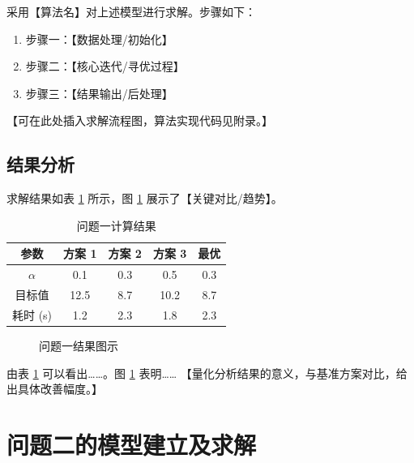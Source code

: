 \documentclass[withoutpreface,bwprint]{cumcmthesis}
\begin{document}
采用【算法名】对上述模型进行求解。步骤如下：

\begin{enumerate}
    \item 步骤一：【数据处理/初始化】
    \item 步骤二：【核心迭代/寻优过程】
    \item 步骤三：【结果输出/后处理】
\end{enumerate}

【可在此处插入求解流程图，算法实现代码见附录。】

\subsection{结果分析}

求解结果如表 \cref{tab:result1} 所示，图 \cref{fig:result1} 展示了【关键对比/趋势】。

{\renewcommand{\arraystretch}{1.38}
\setlength{\tabcolsep}{6pt}
\begin{longtable}{ccccc}
    \caption{问题一计算结果}\label{tab:result1}\\
    \toprule[1.5pt]
    参数       & 方案 1 & 方案 2 & 方案 3 & 最优  \\
    \midrule[1pt]
    \endfirsthead
    \endhead
    \bottomrule[1.5pt]
    \endlastfoot
    $\alpha$ & 0.1  & 0.3  & 0.5  & 0.3 \\
    目标值      & 12.5 & 8.7  & 10.2 & 8.7 \\
    耗时 (s)   & 1.2  & 2.3  & 1.8  & 2.3 \\
\end{longtable}}

\begin{figure}[H]
    \centering
    \caption{问题一结果图示}
    \label{fig:result1}
\end{figure}

由表 \cref{tab:result1} 可以看出……。图 \cref{fig:result1} 表明……
【量化分析结果的意义，与基准方案对比，给出具体改善幅度。】

\section{问题二的模型建立及求解}
\end{document}
